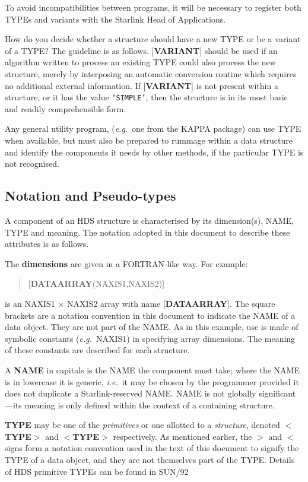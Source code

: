 \documentclass[twoside,11pt]{article}
\newcommand{\xref}[3]{#1}
\newcommand{\xlabel}[1]{}
\renewcommand{\_}{\texttt{\symbol{95}}}
\begin{document}
To avoid incompatibilities between programs, it will be necessary to
register both TYPEs and variants with the Starlink Head of Applications. 

How do you decide whether a structure should have
a new TYPE or be a variant of a TYPE?  The guideline is as
follows.  {[}{\bf VARIANT}{]} should be used
if an algorithm written to process an existing TYPE could also process
the new structure, merely by interposing an automatic conversion routine
which requires no additional external information.
If {[}{\bf VARIANT}{]} is not present within a structure,
or it has the value {\tt `SIMPLE'},
then the structure is in its most basic and readily
comprehensible form.

Any general utility program, ({\it e.g.}\  one from the
{\small KAPPA} package) can use TYPE
when available, but must also be prepared
to rummage within a data structure
and identify the components it needs by other methods, if the particular
TYPE is not recognised.

\subsection{\xlabel{se_notation}Notation and Pseudo-types\label{se:notation}}

A component of an HDS structure is characterised
by its dimension(s), NAME, TYPE and meaning.  The
notation adopted in this document to describe these
attributes is as follows.

The {\bf dimensions} are given in a FORTRAN-like way.
For example:
\begin{verse}
   {[}{\bf DATA\_ARRAY}(NAXIS1,NAXIS2){]}
\end{verse}
is an NAXIS1 $\times$ NAXIS2 array with name
{[}{\bf DATA\_ARRAY}{]}.
The square brackets are a notation convention
in this document to indicate the
NAME of a data object. They are not part of the NAME.
As in this example, use is made of symbolic constants ({\it e.g.}\  NAXIS1)
in specifying array dimensions.
The meaning of these constants are described for each structure.

A {\bf NAME} in capitals is the NAME the component must take; where the NAME
is in lowercase it is generic, {\it i.e.}\  it may be chosen by the
programmer provided it does not duplicate a Starlink-reserved NAME.
NAME is not globally significant---its meaning is only defined within
the context of a containing structure.

{\bf TYPE} may be one of the {\it primitives} or one
allotted to a {\it structure},
denoted $<${\bf \_TYPE}$>$ and
$<${\bf TYPE}$>$ respectively. As mentioned earlier, the $>$ and
$<$ signs form a notation convention used in the text of this
document to signify the TYPE of a data object, and they are not
themselves part of the TYPE. Details of
HDS primitive TYPEs can be found in \xref{SUN/92}{sun92}.
\end{document}

